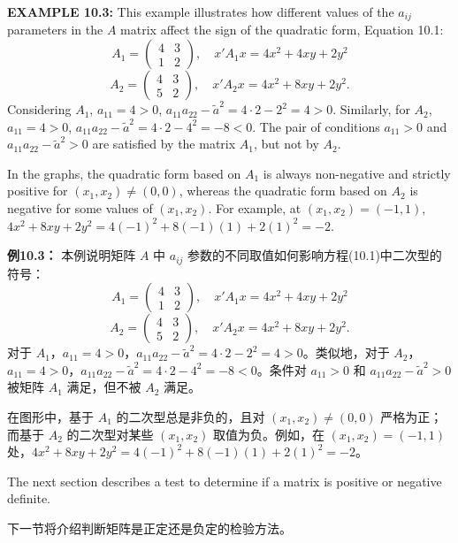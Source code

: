 \begin{original}
\textbf{EXAMPLE 10.3:} This example illustrates how different values of the $a_{ij}$ parameters in the $A$ matrix affect the sign of the quadratic form, Equation 10.1:
\[
A_1 = \begin{pmatrix} 4 & 3 \\ 1 & 2 \end{pmatrix}, \quad x'A_1x = 4x^2 + 4xy + 2y^2
\]
\[
A_2 = \begin{pmatrix} 4 & 3 \\ 5 & 2 \end{pmatrix}, \quad x'A_2x = 4x^2 + 8xy + 2y^2.
\]
Considering $A_1$, $a_{11} = 4 > 0$, $a_{11}a_{22} - \tilde{a}^2 = 4 \cdot 2 - 2^2 = 4 > 0$. Similarly, for $A_2$, $a_{11} = 4 > 0$, $a_{11}a_{22} - \tilde{a}^2 = 4 \cdot 2 - 4^2 = -8 < 0$. The pair of conditions $a_{11} > 0$ and $a_{11}a_{22} - \tilde{a}^2 > 0$ are satisfied by the matrix $A_1$, but not by $A_2$.

In the graphs, the quadratic form based on $A_1$ is always non-negative and strictly positive for $(x_1, x_2) \neq (0,0)$, whereas the quadratic form based on $A_2$ is negative for some values of $(x_1, x_2)$. For example, at $(x_1, x_2) = (-1,1)$, $4x^2 + 8xy + 2y^2 = 4(-1)^2 + 8(-1)(1) + 2(1)^2 = -2$.
\end{original}
\begin{translation}
\textbf{例10.3：} 本例说明矩阵 $A$ 中 $a_{ij}$ 参数的不同取值如何影响方程(10.1)中二次型的符号：
\[
A_1 = \begin{pmatrix} 4 & 3 \\ 1 & 2 \end{pmatrix}, \quad x'A_1x = 4x^2 + 4xy + 2y^2
\]
\[
A_2 = \begin{pmatrix} 4 & 3 \\ 5 & 2 \end{pmatrix}, \quad x'A_2x = 4x^2 + 8xy + 2y^2.
\]
对于 $A_1$，$a_{11} = 4 > 0$，$a_{11}a_{22} - \tilde{a}^2 = 4 \cdot 2 - 2^2 = 4 > 0$。类似地，对于 $A_2$，$a_{11} = 4 > 0$，$a_{11}a_{22} - \tilde{a}^2 = 4 \cdot 2 - 4^2 = -8 < 0$。条件对 $a_{11} > 0$ 和 $a_{11}a_{22} - \tilde{a}^2 > 0$ 被矩阵 $A_1$ 满足，但不被 $A_2$ 满足。

在图形中，基于 $A_1$ 的二次型总是非负的，且对 $(x_1, x_2) \neq (0,0)$ 严格为正；而基于 $A_2$ 的二次型对某些 $(x_1, x_2)$ 取值为负。例如，在 $(x_1, x_2) = (-1,1)$ 处，$4x^2 + 8xy + 2y^2 = 4(-1)^2 + 8(-1)(1) + 2(1)^2 = -2$。
\end{translation}

\begin{original}
The next section describes a test to determine if a matrix is positive or negative definite.
\end{original}
\begin{translation}
下一节将介绍判断矩阵是正定还是负定的检验方法。
\end{translation}

